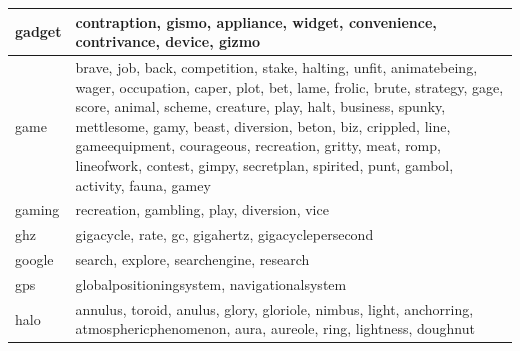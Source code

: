 \documentclass[12pt,a4paper]{report}
\begin{document}
\begin{table}[H]
\begin{center}
\begin{tabular}{ |l|p{13cm}|}
\hline
gadget & contraption, gismo, appliance, widget, convenience, contrivance, device, gizmo\\
\hline
game & brave, job, back, competition, stake, halting, unfit, animatebeing, wager, occupation, caper, plot, bet, lame, frolic, brute, strategy, gage, score, animal, scheme, creature, play, halt, business, spunky, mettlesome, gamy, beast, diversion, beton, biz, crippled, line, gameequipment, courageous, recreation, gritty, meat, romp, lineofwork, contest, gimpy, secretplan, spirited, punt, gambol, activity, fauna, gamey\\
\hline
gaming & recreation, gambling, play, diversion, vice\\
\hline
ghz & gigacycle, rate, gc, gigahertz, gigacyclepersecond\\
\hline
google & search, explore, searchengine, research\\
\hline
gps & globalpositioningsystem, navigationalsystem\\
\hline
halo & annulus, toroid, anulus, glory, gloriole, nimbus, light, anchorring, atmosphericphenomenon, aura, aureole, ring, lightness, doughnut\\
\hline



\end{tabular}
\end{center}
\end{table}
\end{document}
